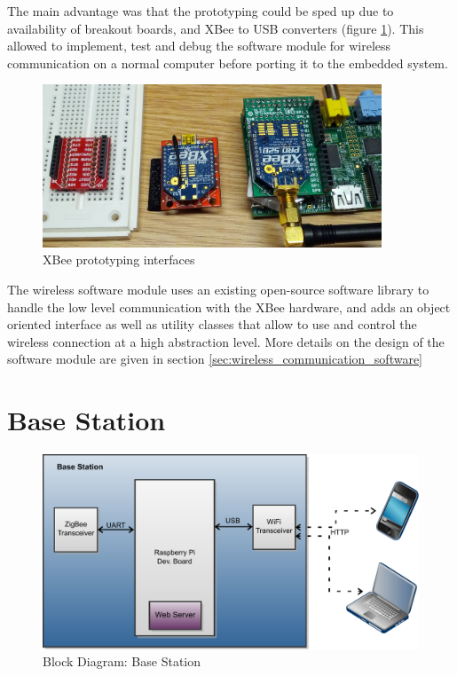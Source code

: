 The main advantage was that the prototyping could be sped up due to availability of breakout boards, and XBee to USB converters (figure \ref{fig:xbee_prototyping_interfaces}). This allowed to implement, test and debug the software module for wireless communication on a normal computer before porting it to the embedded system.

\begin{figure}
\centering
\includegraphics[width=0.9\textwidth]{Images/xbee_breakout}
\caption{XBee prototyping interfaces}
\label{fig:xbee_prototyping_interfaces}
\end{figure}

The wireless software module uses an existing open-source software library to handle the low level communication with the XBee hardware, and adds an object oriented interface as well as utility classes that allow to use and control the wireless connection at a high abstraction level. More details on the design of the software module are given in section \ref{sec:wireless_communication_software}


\section{Base Station}
\begin{figure}[htb]
\includegraphics[width=\textwidth]{Images/BaseStationBlockDiagram}
\caption{Block Diagram: Base Station}
\label{fig:block_base_station}
\end{figure}

